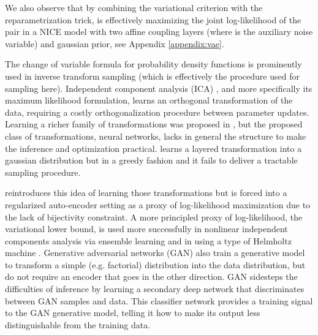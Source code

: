 \documentclass{article}
\begin{document}
We also observe that by combining the variational criterion with
the reparametrization trick, \citep{Kingma+Welling-ICLR2014} is
effectively maximizing the joint log-likelihood of the pair  in a NICE model
with two affine coupling layers (where  is the auxiliary noise variable) and gaussian prior, see Appendix \ref{appendix:vae}.



The change of variable formula for probability density functions is
prominently used in inverse transform sampling (which is effectively the
procedure used for sampling here). Independent component analysis (ICA)
\citep{hyvarinen2000independent}, and more specifically its maximum
likelihood formulation, learns an orthogonal transformation of the data,
requiring a costly orthogonalization procedure between parameter updates.
Learning a richer family of transformations was proposed in \citep{Bengio91},
but the proposed class of
transformations, neural networks, lacks in general the structure to make the inference
and optimization practical. \citep{chen2000gaussianization} learns a
layered transformation into a gaussian distribution but in a greedy fashion and it fails to deliver a tractable sampling procedure.

\citep{rippel2013high} reintroduces this idea of learning those transformations
but is forced into a regularized
auto-encoder setting as a proxy of log-likelihood maximization due to the lack of
bijectivity constraint. A more principled
proxy of log-likelihood, the variational lower bound, is used more successfully in
nonlinear independent components analysis \citep{hyvarinen1999nonlinear}
via ensemble learning \citep{roberts2001independent, lappalainen2000nonlinear} and in
\citep{Kingma+Welling-ICLR2014, Rezende-et-al-arxiv2014} using a type of Helmholtz machine \citep{Dayan95}.
Generative adversarial networks (GAN) \citep{Goodfellow-et-al-ARXIV2014} also
train a generative model to transform a simple 
(e.g. factorial) distribution into the data distribution, but do not require an encoder that
goes in the other direction. GAN sidesteps the difficulties of
inference by learning a secondary deep network that discriminates
between GAN samples and data.
This classifier network provides a training signal to the GAN generative model,
telling it how to make its output less distinguishable from the training data.
\end{document}

